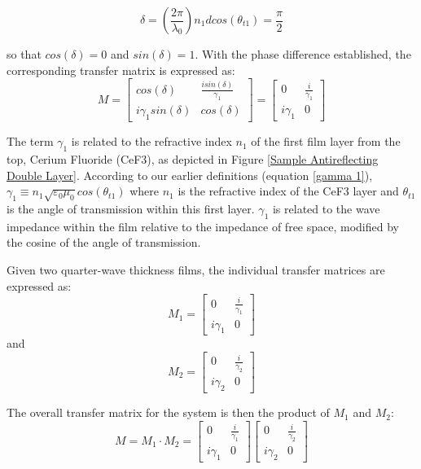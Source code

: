 \begin{equation}
    \delta = \left(\frac{2\pi}{\lambda_0}\right) n_1dcos(\theta_{t1}) = \frac{\pi}{2}
\end{equation}

so that $cos(\delta) = 0$ and $sin(\delta) = 1$. With the phase difference established, the corresponding transfer matrix is expressed as:
    \[
    M = 
            \begin{bmatrix}
            cos(\delta) & \frac{isin(\delta)}{\gamma_1} \\
            i\gamma_1sin(\delta) & cos(\delta)
            \end{bmatrix} = 
                \begin{bmatrix}
                0 & \frac{i}{\gamma_1}  \\
                i\gamma_1 & 0
              \end{bmatrix}
    \]

The term $\gamma_1$ is related to the refractive index $n_1$ of the first film layer from the top, Cerium Fluoride (CeF3), as depicted in Figure \ref{Sample Antireflecting Double Layer}. According to our earlier definitions (equation \ref{gamma 1}), $\gamma_1 \equiv n_1 \sqrt{\varepsilon_0\mu_0} cos(\theta_{t1})$ where $n_1$ is the refractive index of the CeF3 layer and $\theta_{t1}$ is the angle of transmission within this first layer. $\gamma_1$ is related to the wave impedance within the film relative to the impedance of free space, modified by the cosine of the angle of transmission.

Given two quarter-wave thickness films, the individual transfer matrices are expressed as:
\[
M_1 = 
    \begin{bmatrix}
        0 & \frac{i}{\gamma_1}  \\
        i\gamma_1 & 0
    \end{bmatrix}
\]
and
\[
M_2 = 
    \begin{bmatrix}
        0 & \frac{i}{\gamma_2}  \\
        i\gamma_2 & 0
    \end{bmatrix}
\]

The overall transfer matrix for the system is then the product of \(M_1\) and \(M_2\):
\[
M = M_1 \cdot M_2 = 
    \begin{bmatrix}
        0 & \frac{i}{\gamma_1}  \\
        i\gamma_1 & 0
    \end{bmatrix}
    \begin{bmatrix}
        0 & \frac{i}{\gamma_2}  \\
        i\gamma_2 & 0
    \end{bmatrix}
\]

